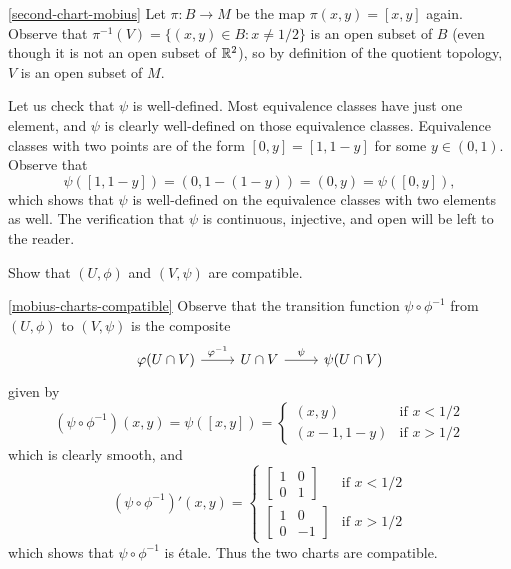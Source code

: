 \begin{solution}{\cref{second-chart-mobius}}
	Let $\pi : B \to M$ be the map $\pi(x, y) = [x,y]$ again. Observe that $\pi^{-1}(V) = \{ (x,y) \in B : x \neq 1/2 \}$  is an open subset of $B$ (even though it is not an open subset of $\mathbb{R}^2$), so by definition of the quotient topology, $V$ is an open subset of $M$. 
	
	Let us check that $\psi$ is well-defined. Most equivalence classes have just one element, and $\psi$ is clearly well-defined on those equivalence classes. Equivalence classes with two points are of the form $[0,y] = [1,1-y]$ for some $y \in (0,1)$. Observe that 
	\[ \psi([1,1-y]) = (0,1-(1-y)) = (0,y) = \psi([0,y]), \]
	which shows that $\psi$ is well-defined on the equivalence classes with two elements as well. 
	The verification that $\psi$ is continuous, injective, and open will be left to the reader. 
\end{solution}

\begin{exercise} \label{mobius-charts-compatible}
	Show that $(U, \phi)$ and $(V, \psi)$ are compatible.
\end{exercise}

\begin{solution}{\cref{mobius-charts-compatible}}
	Observe that the transition function $\psi \circ  \phi^{-1}$ from $(U,\phi)$ to $(V,\psi)$ is the composite 
	\[ \begin{tikzcd} \phi(U \cap V) \ar{r}{\phi^{-1}} & U \cap V \ar{r}{\psi} & \psi(U \cap V) \end{tikzcd} \]
	given by 
	\[ (\psi \circ \phi^{-1})(x,y) = \psi([x,y]) = \begin{cases} (x,y) & \text{if } x < 1/2 \\ (x-1, 1-y) & \text{if } x > 1/2 \end{cases} \]
	which is clearly smooth, and 
	\[ (\psi \circ \phi^{-1})'(x,y) = \begin{cases} \begin{bmatrix} 1 & 0 \\ 0 & 1 \end{bmatrix} & \text{if } x < 1/2 \\ \begin{bmatrix} 1 & 0 \\ 0 & -1 \end{bmatrix} & \text{if } x > 1/2 \end{cases} \]
	which shows that $\psi \circ \phi^{-1}$ is \'etale. Thus the two charts are compatible. 
\end{solution}

